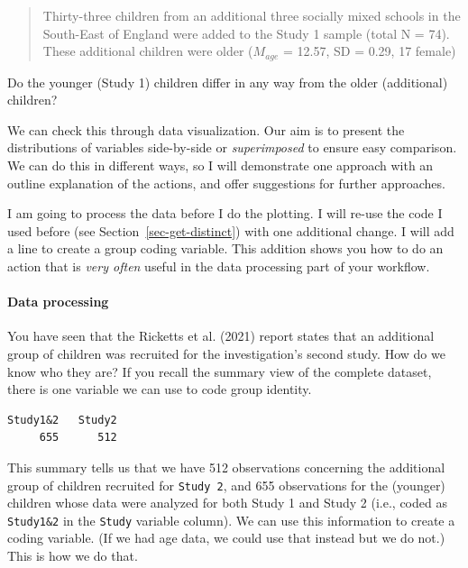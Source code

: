 \documentclass[
  letterpaper,
  DIV=11,
  numbers=noendperiod]{scrreprt}
\let\oldparagraph\paragraph
\renewcommand{\paragraph}[1]{\oldparagraph{#1}\mbox{}}
\newenvironment{Shaded}{\begin{snugshade}}{\end{snugshade}}
\newcommand{\FunctionTok}[1]{\textcolor[rgb]{0.28,0.35,0.67}{#1}}
\newcommand{\NormalTok}[1]{\textcolor[rgb]{0.00,0.23,0.31}{#1}}
\newcommand{\SpecialCharTok}[1]{\textcolor[rgb]{0.37,0.37,0.37}{#1}}
\begin{document}
\begin{quote}
Thirty-three children from an additional three socially mixed schools in
the South-East of England were added to the Study 1 sample (total N =
74). These additional children were older (\(M_{age}\) = 12.57, SD =
0.29, 17 female)
\end{quote}

Do the younger (Study 1) children differ in any way from the older
(additional) children?

We can check this through data visualization. Our aim is to present the
distributions of variables side-by-side or \emph{superimposed} to ensure
easy comparison. We can do this in different ways, so I will demonstrate
one approach with an outline explanation of the actions, and offer
suggestions for further approaches.

I am going to process the data before I do the plotting. I will re-use
the code I used before (see Section~\ref{sec-get-distinct}) with one
additional change. I will add a line to create a group coding variable.
This addition shows you how to do an action that is \emph{very often}
useful in the data processing part of your workflow.

\hypertarget{sec-process-code-group}{%
\paragraph{Data processing}\label{sec-process-code-group}}

You have seen that the Ricketts et al. (2021) report states that an
additional group of children was recruited for the investigation's
second study. How do we know who they are? If you recall the summary
view of the complete dataset, there is one variable we can use to code
group identity.

\begin{Shaded}
\end{Shaded}

\begin{verbatim}
Study1&2   Study2 
     655      512 
\end{verbatim}

This summary tells us that we have 512 observations concerning the
additional group of children recruited for \texttt{Study\ 2}, and 655
observations for the (younger) children whose data were analyzed for
both Study 1 and Study 2 (i.e., coded as \texttt{Study1\&2} in the
\texttt{Study} variable column). We can use this information to create a
coding variable. (If we had age data, we could use that instead but we
do not.) This is how we do that.
\end{document}
